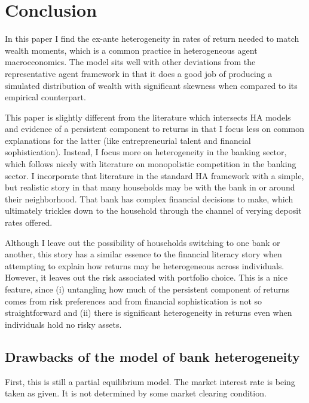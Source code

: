 \onlyinsubfile{\setcounter{section}{5}}
\section{Conclusion}
\notinsubfile{\label{sec:Conclusion}}

\par In this paper I find the ex-ante heterogeneity in rates of return needed to match wealth moments, which is a common practice in heterogeneous agent macroeconomics. The model sits well with other deviations from the representative agent framework in that it does a good job of producing a simulated distribution of wealth with significant skewness when compared to its empirical counterpart.

\par This paper is slightly different from the literature which intersects HA models and evidence of a persistent component to returns in that I focus less on common explanations for the latter (like entrepreneurial talent and financial sophistication). Instead, I focus more on heterogeneity in the banking sector, which follows nicely with literature on monopolistic competition in the banking sector. I incorporate that literature in the standard HA framework with a simple, but realistic story in that many households may be  with the bank in or around their neighborhood. That bank has complex financial decisions to make, which ultimately trickles down to the household through the channel of verying deposit rates offered.

\par Although I leave out the possibility of households switching to one bank or another, this story has a similar essence to the financial literacy story when attempting to explain how returns may be heterogeneous across individuals. However, it leaves out the risk associated with portfolio choice. This is a nice feature, since (i) untangling how much of the persistent component of returns comes from risk preferences and from financial sophistication is not so straightforward and (ii) there is significant heterogeneity in returns even when individuals hold no risky assets.

\subsection{Drawbacks of the model of bank heterogeneity}

\par First, this is still a partial equilibrium model. The market interest rate is being taken as given. It is not determined by some market clearing condition.

